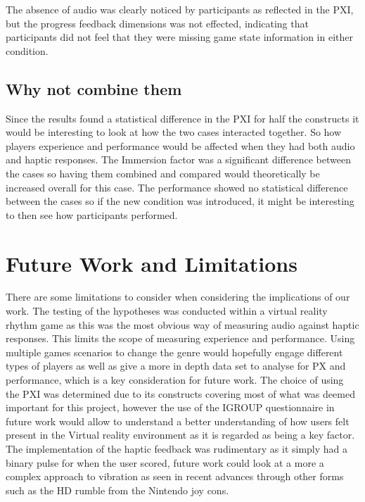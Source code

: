 \documentclass[manuscript,screen]{acmart}
\begin{document}
The absence of audio was clearly noticed by participants as reflected in the PXI, but the progress feedback dimensions was not effected, indicating that participants did not feel that they were missing game state information in either condition. 

\subsection{Why not combine them}
Since the results found a statistical difference in the PXI for half the constructs it would be interesting to look at how the two cases interacted together. So how players experience and performance would be affected when they had both audio and haptic responses. The Immersion factor was a significant difference between the cases so having them combined and compared would theoretically be increased overall for this case. The performance showed no statistical difference between the cases so if the new condition was introduced, it might be interesting to then see how participants performed.



\section{Future Work and Limitations}
There are some limitations to consider when considering the implications of our work. The testing of the hypotheses was conducted within a virtual reality rhythm game as this was the most obvious way of measuring audio against haptic responses. This limits the scope of measuring experience and performance. Using multiple games scenarios to change the genre would hopefully engage different types of players as well as give a more in depth data set to analyse for PX and performance, which is a key consideration for future work. The choice of using the PXI was determined due to its constructs covering most of what was deemed important for this project, however the use of the IGROUP questionnaire in future work would allow to understand a better understanding of how users felt present in the Virtual reality environment as it is regarded as being a key factor. The implementation of the haptic feedback was rudimentary as it simply had a binary pulse for when the user scored, future work could look at a more a complex approach to vibration as seen in recent advances through other forms such as the HD rumble from the Nintendo joy cons.
\end{document}
